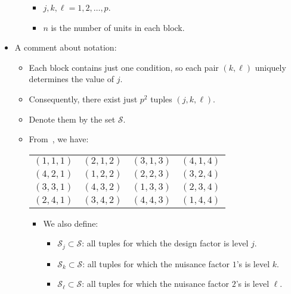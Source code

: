 \begin{itemize}
\begin{itemize}
\begin{itemize}
                        \item $ j,k,\ell=1,2,\ldots,p $.
                        \item $ n $ is the number of units in each block.
                    \end{itemize}
          \end{itemize}
    \item A comment about notation:
          \begin{itemize}
              \item Each block contains just one condition, so each pair $(k, \ell)$ uniquely determines the value of $j$.
              \item Consequently, there exist just $p^2$ tuples $(j, k, \ell)$.
              \item Denote them by the set $ \mathcal{S} $.
              \item From~, we have:
                    \begin{table}[!htbp]
                        \centering
                        \begin{NiceTabular}{|cccc|}
                            \toprule
                            $ (1,1,1) $ & $ (2,1,2) $ & $ (3,1,3) $ & $ (4,1,4) $\\
                            $ (4,2,1) $ & $ (1,2,2) $ & $ (2,2,3) $ & $ (3,2,4) $\\
                            $ (3,3,1) $ & $ (4,3,2) $ & $ (1,3,3) $ & $ (2,3,4) $\\
                            $ (2,4,1) $ & $ (3,4,2) $ & $ (4,4,3) $ & $ (1,4,4) $\\
                            \bottomrule
                        \end{NiceTabular}
                    \end{table}
                    \begin{itemize}
                        \item We also define:
                              \begin{itemize}
                                  \item $ \mathcal{S}_j\subset \mathcal{S} $: all tuples for which the design factor is level $ j $.
                                  \item $ \mathcal{S}_k\subset \mathcal{S} $: all tuples for which the nuisance factor $ 1 $'s is level $ k $.
                                  \item $ \mathcal{S}_\ell\subset \mathcal{S} $: all tuples for which the nuisance factor $ 2 $'s is level $ \ell $.

\end{itemize}
\end{itemize}
\end{itemize}
\end{itemize}
